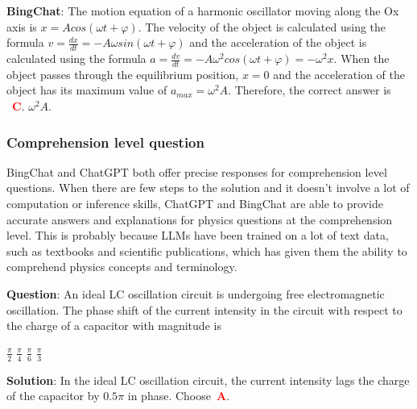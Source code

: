 \documentclass{article}
\begin{document}
{\begin{mdframed}[linewidth=1pt,linecolor=red]
		\textbf{BingChat}: The motion equation of a harmonic oscillator moving along the Ox axis is $x = Acos(\omega t + \varphi)$. The velocity of the object is calculated using the formula $v = \frac{dx}{dt} = -A\omega sin(\omega t + \varphi)$ and the acceleration of the object is calculated using the formula $a = \frac{dv}{dt} = -A\omega^2 cos(\omega t + \varphi) = -\omega^2 x$. When the object passes through the equilibrium position, $x = 0$ and the acceleration of the object has its maximum value of $a_{max} = \omega^2 A$. Therefore, the correct answer is ~\textcolor{red}{\textbf{C}}. $\omega^2 A$. 
		
	\end{mdframed}	
	
	\subsubsection{Comprehension level question}
	\label{VNHSGE_Phy_C}
	
	BingChat and ChatGPT both offer precise responses for comprehension level questions. When there are few steps to the solution and it doesn't involve a lot of computation or inference skills, ChatGPT and BingChat are able to provide accurate answers and explanations for physics questions at the comprehension level. This is probably because LLMs have been trained on a lot of text data, such as textbooks and scientific publications, which has given them the ability to comprehend physics concepts and terminology.
	
	
	\begin{mdframed}[linewidth=1pt,linecolor=red] \textbf{Question}: An ideal LC oscillation circuit is undergoing free electromagnetic oscillation. The phase shift of the current intensity in the circuit with respect to the charge of a capacitor with magnitude is
		
		\begin{oneparchoices}
			\choice $\frac{\pi}{2}$
			\choice $\frac{\pi}{4}$
			\choice $\frac{\pi}{6}$
			\choice $\frac{\pi}{3}$
		\end{oneparchoices}
		
		\textbf{Solution}: In the ideal LC oscillation circuit, the current intensity lags the charge of the capacitor by $0.5 \pi$ in phase. Choose~\textcolor{red}{\textbf{A}}. 
		

\end{mdframed}}
\end{document}
